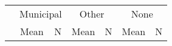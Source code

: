 \begin{tabular}{l c c c c c c}
\toprule
 & \multicolumn{2}{c}{Municipal} & \multicolumn{2}{c}{Other} & \multicolumn{2}{c}{None} \\ & Mean & N & Mean & N & Mean & N \\
\midrule
\bottomrule
\end{tabular}
